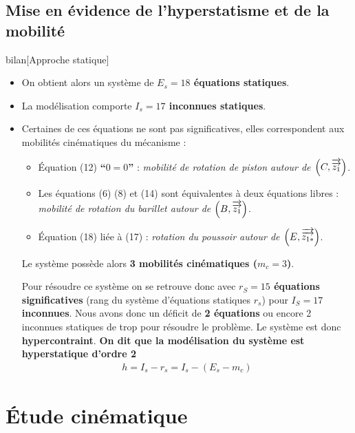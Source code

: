 \documentclass[10pt,fleqn]{article} %
\begin{document}
\begin{multicols}{2}
\begin{multicols}{2}
\subsection{Mise en évidence de l'hyperstatisme et de la mobilité}
{bilan}[Approche statique]
\begin{itemize}
\item On obtient alors un système de \textbf{$E_s=18$ équations statiques}.
\item La modélisation comporte \textbf{$I_s=17$ inconnues statiques}.
\item Certaines de ces équations ne sont pas significatives, elles correspondent aux mobilités cinématiques du mécanisme :
		\begin{itemize}
		\item Équation (12) \textbf{``$0=0$''} : \textit{mobilité de rotation de piston autour de $\left(C,\overrightarrow{\overrightarrow{z_1}}\right)$}.
		\item Les équations (6) (8) et (14) sont équivalentes à deux équations libres : \textit{mobilité de rotation du barillet autour de $\left(B,\overrightarrow{\overrightarrow{z_1}}\right)$}.
		\item Équation (18) liée à (17) : \textit{rotation du poussoir autour de $\left(E,\overrightarrow{\overrightarrow{z_{1*}}}\right)$}.		
		\end{itemize}
Le système possède alors \textbf{3 mobilités cinématiques ($m_c=3$)}.
		
		Pour résoudre ce système on se retrouve donc avec \textbf{$r_S=15$ équations significatives} (rang du système d'équations statiques $r_s$) pour \textbf{$I_S=17$ inconnues}. Nous avons donc un déficit de \textbf{2 équations} ou encore 2 inconnues statiques de trop pour résoudre le problème. Le système est donc \textbf{hypercontraint}.
		\textbf{On dit que la modélisation du système est hyperstatique d'ordre 2}
\begin{align}\label{hyper_statique}
\boxed{
h=I_s-r_s=I_s-(E_s-m_c)
}
\end{align}
		
\end{itemize}





\section{Étude cinématique}

\end{multicols}
\end{multicols}
\end{document}
